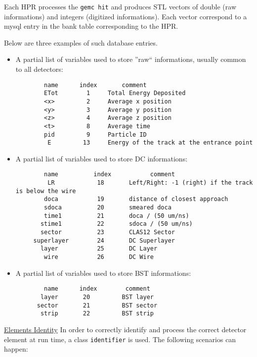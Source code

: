 \vskip 0.5cm

Each HPR processes the {\tt gemc hit} and produces STL vectors of double (raw informations)
and integers (digitized informations). Each vector correspond to a mysql entry in the bank table
corresponding to the HPR. 

\clearpage\newpage
\vskip 2cm
Below are three examples of such database entries.

\begin{itemize}
\item A partial list of variables used to store ''raw`` informations, usually common to all detectors:
\footnotesize
\begin{verbatim}
        name      index       comment
        ETot        1     Total Energy Deposited
        <x>         2     Average x position
        <y>         3     Average y position
        <z>         4     Average z position
        <t>         8     Average time
        pid         9     Particle ID
         E         13     Energy of the track at the entrance point
\end{verbatim}
\normalsize

\vskip 1cm
\item A partial list of variables used to store DC informations:
\footnotesize
\begin{verbatim}
        name          index           comment
         LR            18       Left/Right: -1 (right) if the track is below the wire
        doca           19       distance of closest approach
        sdoca          20       smeared doca
        time1          21       doca / (50 um/ns)
       stime1          22       sdoca / (50 um/ns)
       sector          23       CLAS12 Sector
     superlayer        24       DC Superlayer
       layer           25       DC Layer
        wire           26       DC Wire
\end{verbatim}
\normalsize

\vskip 1cm
\item A partial list of variables used to store BST informations:
\footnotesize
\begin{verbatim}
        name      index        comment
       layer       20         BST layer
      sector       21         BST sector
       strip       22         BST strip
\end{verbatim}
\normalsize
\end{itemize}
\clearpage\newpage



\vskip 1.0cm
\underline{Elements Identity}
\vskip 0.5cm
\noindent In order to correctly identify and process the correct detector element at run time, a class {\tt identifier} is used.
The following scenarios can happen:

